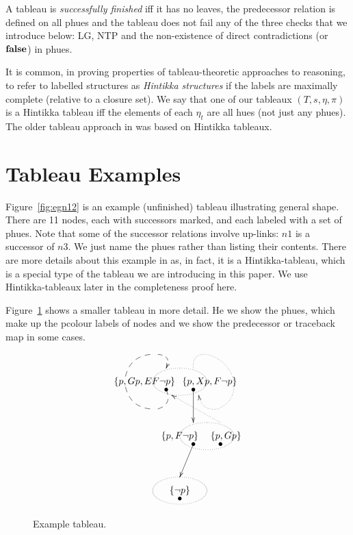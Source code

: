 \documentclass[submission,copyright,creativecommons]{eptcs}
\newcommand{\falsity}{\mbox{{\bf false}}}
\begin{document}
A tableau is {\em successfully finished}
iff it 
has no leaves,
the predecessor relation is defined on all phues
and
the tableau does not fail any of the
three checks that we introduce below:
LG, NTP and
the non-existence of direct contradictions
(or $\falsity$)
in phues.

It is common, in proving properties
of tableau-theoretic approaches
to reasoning,
to refer to labelled
structures as {\em Hintikka structures}
if the labels 
are maximally complete
(relative to a closure set).
We say that one of our tableaux
$(T,s,\eta,\pi)$ is a Hintikka tableau
iff the
elements of each $\eta_t$
are all hues
(not just any phues).
The older tableau approach
in \cite{Rey:startab}
was based on Hintikka tableaux.




\section{Tableau Examples}
\label{sec:tegs}

Figure~\ref{fig:egn12}
is an example (unfinished) tableau 
illustrating general shape.
There are 11 nodes, 
each with successors marked,
and each labeled with a set of phues.
Note that some of the successor relations involve up-links:
$n1$ is a successor of $n3$.
We just name the phues rather than listing their contents.
There are more details about this example
in \cite{Rey:startab} as, in fact, it is
a Hintikka-tableau,
which is a special type of the tableau
we are introducing in this paper.
We use Hintikka-tableaux later in the
completeness proof here.

Figure~\ref{fig:meg}
shows a smaller tableau in more detail.
He we show the phues, which make up the pcolour labels
of nodes
and we show the predecessor or traceback map
in some cases.

\begin{figure}


\[
\xy
(20,50)*\xycircle(10,5){.};
(7,50)*{\{p, Gp, EF\neg p\}};
(15,47)*{\bullet};
{\ar @{--} @/^/(15,47)*{};(12,40)*{}};
{\ar@{--} @/^/(9,40)*{};(0,48)*{}};
{\ar@{--} @/^/(0,52)*{};(9,60)*{}};
{\ar@{-->} @/^/(12,60)*{};(15,55)*{}};
{\ar@{.} @/^/(25,55)*{};(30,60)*{}};
{\ar@{.} @/^/(30,60)*{};(40,50)*{}};
{\ar@{.} @/^/(40,50)*{};(34,40)*{}};
{\ar@{..>} @/^/(34,40)*{};(27,45)*{}};
(31,50)*{\{p, Xp, F \neg p \}};
(25,47)*{\bullet};
{\ar(25,47)*{};(25,35)*{}};
(30,30)*\xycircle(10,5){.};
(20,30)*{\{p,F \neg p\}};
(25,27)*{\bullet};
{\ar@{..>} (35,35)*{};(17,45)*{}};
(37,30)*{\{p, G p \}};
(35,27)*{\bullet};
{\ar(25,27)*{};(20,15)*{}};
(20,10)*\xycircle(10,5){.};
(20,10)*{\{\neg p\}};
(20,7)*{\bullet};
\endxy
\]

\caption{Example tableau.}

\label{fig:meg}
\end{figure}
\end{document}
